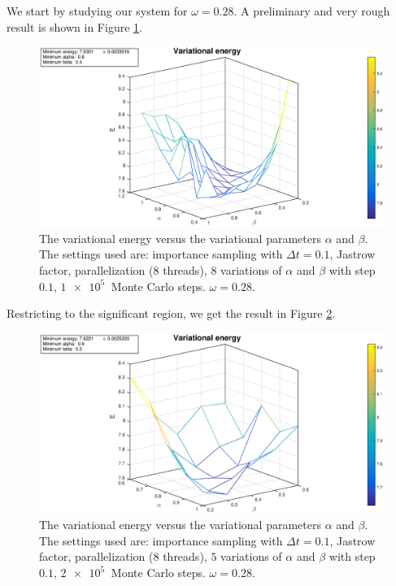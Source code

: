 \documentclass[a4paper,twoside,11pt]{book}
\begin{document}
We start by studying our system for $\omega = 0.28$. A preliminary and very rough result is shown in Figure \ref{fig:6e-028-rep}.
\begin{figure}[H]
	\centering
	\includegraphics[width=\textwidth]{6e-028-rep}
	\caption{The variational energy versus the variational parameters $\alpha$ and $\beta$. The settings used are: importance sampling with $\Delta t = 0.1$, Jastrow factor, parallelization (8 threads), $8$ variations of $\alpha$ and $\beta$ with step $0.1$, $\SI{1e5}{}$ Monte Carlo steps. $\omega=0.28$.}
	\label{fig:6e-028-rep}
\end{figure}
Restricting to the significant region, we get the result in Figure \ref{fig:6e-028-rep_fine}.
\begin{figure}%
	\centering
	\includegraphics[width=\textwidth]{6e-028-rep_fine}
	\caption{The variational energy versus the variational parameters $\alpha$ and $\beta$. The settings used are: importance sampling with $\Delta t = 0.1$, Jastrow factor, parallelization (8 threads), $5$ variations of $\alpha$ and $\beta$ with step $0.1$, $\SI{2e5}{}$ Monte Carlo steps. $\omega=0.28$.}
	\label{fig:6e-028-rep_fine}
\end{figure}
\end{document}
